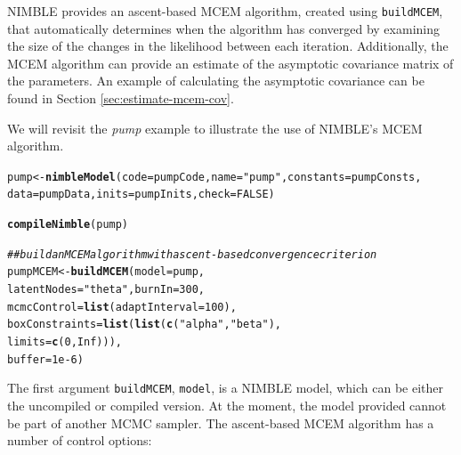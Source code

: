 \documentclass[12pt,oneside]{book}\usepackage[]{graphicx}\usepackage[]{color}
\makeatletter
\newcommand{\hlnum}[1]{\textcolor[rgb]{0.686,0.059,0.569}{#1}}%
\newcommand{\hlstr}[1]{\textcolor[rgb]{0.192,0.494,0.8}{#1}}%
\newcommand{\hlcom}[1]{\textcolor[rgb]{0.678,0.584,0.686}{\textit{#1}}}%
\newcommand{\hlstd}[1]{\textcolor[rgb]{0.345,0.345,0.345}{#1}}%
\newcommand{\hlkwb}[1]{\textcolor[rgb]{0.69,0.353,0.396}{#1}}%
\newcommand{\hlkwc}[1]{\textcolor[rgb]{0.333,0.667,0.333}{#1}}%
\newcommand{\hlkwd}[1]{\textcolor[rgb]{0.737,0.353,0.396}{\textbf{#1}}}%
\newenvironment{kframe}{%
 \def\at@end@of@kframe{}%
 \ifinner\ifhmode%
  \def\at@end@of@kframe{\end{minipage}}%
  \begin{minipage}{\columnwidth}%
 \fi\fi%
 \def\FrameCommand##1{\hskip\@totalleftmargin \hskip-\fboxsep
 \colorbox{shadecolor}{##1}\hskip-\fboxsep
     \hskip-\linewidth \hskip-\@totalleftmargin \hskip\columnwidth}%
 \MakeFramed {\advance\hsize-\width
   \@totalleftmargin\z@ \linewidth\hsize
   \@setminipage}}%
 {\par\unskip\endMakeFramed%
 \at@end@of@kframe}
\newenvironment{knitrout}{}{} %
\def\cd#1{\texttt{#1}}
\def\nm#1{\textit{#1}}
\makeatother
\begin{document}
  NIMBLE provides an ascent-based MCEM algorithm, created using \cd{buildMCEM}, that automatically determines when the algorithm has converged by examining 
  the size of the changes in the likelihood between each iteration.  Additionally, the MCEM algorithm can provide an estimate of the asymptotic covariance matrix of the parameters.  An example of calculating the asymptotic covariance can be found in Section \ref{sec:estimate-mcem-cov}.
  
  We will revisit the \nm{pump} example to illustrate the use of
  NIMBLE's MCEM algorithm.
  


\begin{knitrout}
\color{fgcolor}\begin{kframe}
\begin{alltt}
\hlstd{pump} \hlkwb{<-} \hlkwd{nimbleModel}\hlstd{(}\hlkwc{code} \hlstd{= pumpCode,} \hlkwc{name} \hlstd{=} \hlstr{"pump"}\hlstd{,} \hlkwc{constants} \hlstd{= pumpConsts,}
                       \hlkwc{data} \hlstd{= pumpData,} \hlkwc{inits} \hlstd{= pumpInits,} \hlkwc{check} \hlstd{=} \hlnum{FALSE}\hlstd{)}

\hlkwd{compileNimble}\hlstd{(pump)}

\hlcom{## build an MCEM algorithm with ascent-based convergence criterion}
\hlstd{pumpMCEM} \hlkwb{<-} \hlkwd{buildMCEM}\hlstd{(}\hlkwc{model} \hlstd{= pump,}
                      \hlkwc{latentNodes} \hlstd{=} \hlstr{"theta"}\hlstd{,} \hlkwc{burnIn} \hlstd{=} \hlnum{300}\hlstd{,}
                      \hlkwc{mcmcControl} \hlstd{=} \hlkwd{list}\hlstd{(}\hlkwc{adaptInterval} \hlstd{=} \hlnum{100}\hlstd{),}
                      \hlkwc{boxConstraints} \hlstd{=} \hlkwd{list}\hlstd{(} \hlkwd{list}\hlstd{(} \hlkwd{c}\hlstd{(}\hlstr{"alpha"}\hlstd{,} \hlstr{"beta"}\hlstd{),}
                                                  \hlkwc{limits} \hlstd{=} \hlkwd{c}\hlstd{(}\hlnum{0}\hlstd{,} \hlnum{Inf}\hlstd{) ) ),}
                      \hlkwc{buffer} \hlstd{=} \hlnum{1e-6}\hlstd{)}
\end{alltt}
\end{kframe}
\end{knitrout}

  The first argument \cd{buildMCEM}, \cd{model}, is a NIMBLE model, which can be
  either the uncompiled or compiled version. At the moment, the model provided cannot be part of another MCMC sampler.  The ascent-based MCEM algorithm has a number of control options:
 
\end{document}
